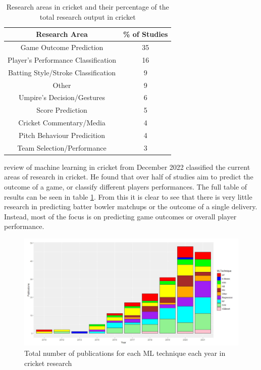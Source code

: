 \documentclass[12pt,a4paper]{report}
\theoremstyle{definition}
\begin{document}
\begin{table}[H] \label{tab:ResearchCrick}
	\centering
	\caption{Research areas in cricket and their percentage of the total research output in cricket \citep{Wickramasinghe2022}}
	\begin{tabular}{| c | c |} 
		\hline
		Research Area & \% of Studies \\ [0.5ex] 
		\hline\hline
		Game Outcome Prediction & 35 \\ 
		\hline
		Player's Performance Classification & 16 \\
		\hline
		Batting Style/Stroke Classification & 9 \\
		\hline
		Other & 9 \\
		\hline
		Umpire's Decision/Gestures & 6 \\
		\hline
		Score Prediction & 5 \\
		\hline
		Cricket Commentary/Media & 4 \\
		\hline
		Pitch Behaviour Predicition & 4 \\
		\hline
		Team Selection/Performance & 3 \\ [1ex] 
		\hline
	\end{tabular}
\end{table}

\citet{Wickramasinghe2022} review of machine learning in cricket from December 2022 classified the current areas of research in cricket. 
He found that over half of studies aim to predict the outcome of a game, or classify different players performances. 
The full table of results can be seen in table \ref{tab:ResearchCrick}. 
From this it is clear to see that there is very little research in predicting batter bowler matchups or the outcome of a single delivery. 
Instead, most of the focus is on predicting game outcomes or overall player performance.

\begin{figure}[H]
    \centering
    \includegraphics[width=\linewidth]{ML_techniques_cricket.png}
    \caption{Total number of publications for each ML technique each year in cricket research \citep{Wickramasinghe2022}}
    \label{fig:NoPapersCricket}
\end{figure}
\end{document}

